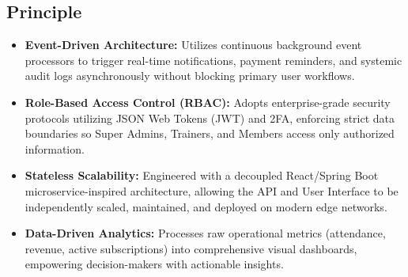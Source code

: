 \documentclass[14pt]{extarticle}
\begin{document}
\begin{tcolorbox}[colframe=itmred, colback=white, boxrule=3pt, arc=0pt, outer arc=0pt, 
                  width=\textwidth, height=\textheight, enlarge top by=-1cm, enlarge bottom by=-1cm]
\section*{\textcolor{itmred}{\large Principle}}
\vspace{-0.4cm}
\begin{itemize}
    \item \textbf{Event-Driven Architecture:} Utilizes continuous background event processors to trigger real-time notifications, payment reminders, and systemic audit logs asynchronously without blocking primary user workflows.
    \item \textbf{Role-Based Access Control (RBAC):} Adopts enterprise-grade security protocols utilizing JSON Web Tokens (JWT) and 2FA, enforcing strict data boundaries so Super Admins, Trainers, and Members access only authorized information.
    \item \textbf{Stateless Scalability:} Engineered with a decoupled React/Spring Boot microservice-inspired architecture, allowing the API and User Interface to be independently scaled, maintained, and deployed on modern edge networks.
    \item \textbf{Data-Driven Analytics:} Processes raw operational metrics (attendance, revenue, active subscriptions) into comprehensive visual dashboards, empowering decision-makers with actionable insights.
\end{itemize}

\vspace{-0.1cm}


\end{tcolorbox}
\end{document}
